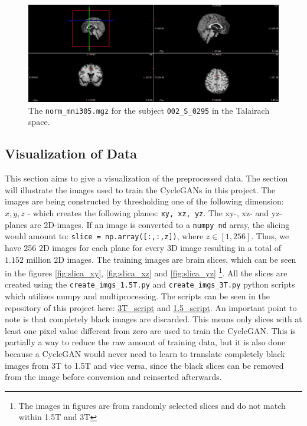 \documentclass[11pt, fleqn, titlepage]{article}
\newcommand{\1}[1]{\mathds{1}\left[#1\right]}
\begin{document}
\begin{figure}[H]
	\centering
	\includegraphics[width=0.9\linewidth]{imgs/norm_305}
	\caption{The \texttt{norm\_mni305.mgz} for the subject \texttt{002\_S\_0295} in the Talairach space.} 
	\label{fig:norm305}
\end{figure}


\subsection{Visualization of Data}
This section aims to give a visualization of the preprocessed data. The section will illustrate the images used to train the CycleGANs in this project. The images are being constructed by thresholding one of the following dimension: $ x, y, z $ - which creates the following planes: \texttt{xy, xz, yz}. The xy-, xz- and yz-planes are 2D-images. If an image is converted to a \texttt{numpy nd} array, the slicing would amount to: \texttt{slice = np.array([:,:,z])}, where $ z \in [1,256] $. Thus, we have 256 2D images for each plane for every 3D image resulting in a total of $ 1.152 $ million 2D images. The training images are brain slices, which can be seen in the figures \ref{fig:slica_xy}, \ref{fig:slica_xz} and \ref{fig:slica_yz} \footnote{The images in figures are from randomly selected slices and do not match within 1.5T and 3T}. All the slices are created using the \texttt{create\_imgs\_1.5T.py} and \texttt{create\_imgs\_3T.py} python scripts which utilizes numpy and multiprocessing. The scripts can be seen in the repository of this project here: \href{https://github.com/oskarwiese/AlzPred/blob/main/preprocessing_scripts/slicing_scripts/3/create_imgs_3T.py}{3T\_script} and \href{https://github.com/oskarwiese/AlzPred/blob/main/preprocessing_scripts/slicing_scripts/1.5/create_imgs_1.5T.py}{1.5\_script}. %
An important point to note is that completely black images are discarded. This means only slices with at least one pixel value different from zero are used to train the CycleGAN. This is partially a way to reduce the raw amount of training data, but it is also done because a CycleGAN would never need to learn to translate completely black images from 3T to 1.5T and vice versa, since the black slices can be removed from the image before conversion and reinserted afterwards.
\end{document}
